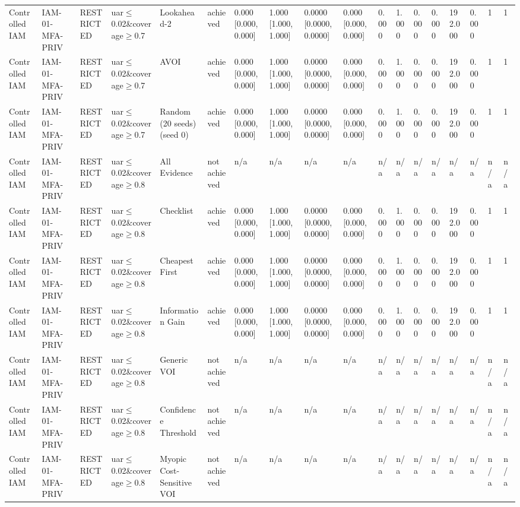 \begin{table}[!ht]
{\begin{tabular}{llllllllllllllllll}
Controlled IAM & IAM-01-MFA-PRIV & RESTRICTED & uar$\le$0.02\&coverage$\ge$0.7 & Lookahead-2 & achieved & 0.000 [0.000, 0.000] & 1.000 [1.000, 1.000] & 0.0000 [0.0000, 0.0000] & 0.000 [0.000, 0.000] & 0.000 & 1.000 & 0.000 & 0.000 & 192.000 & 0.000 & 1 & 1 \\
Controlled IAM & IAM-01-MFA-PRIV & RESTRICTED & uar$\le$0.02\&coverage$\ge$0.7 & AVOI & achieved & 0.000 [0.000, 0.000] & 1.000 [1.000, 1.000] & 0.0000 [0.0000, 0.0000] & 0.000 [0.000, 0.000] & 0.000 & 1.000 & 0.000 & 0.000 & 192.000 & 0.000 & 1 & 1 \\
Controlled IAM & IAM-01-MFA-PRIV & RESTRICTED & uar$\le$0.02\&coverage$\ge$0.7 & Random (20 seeds) (seed 0) & achieved & 0.000 [0.000, 0.000] & 1.000 [1.000, 1.000] & 0.0000 [0.0000, 0.0000] & 0.000 [0.000, 0.000] & 0.000 & 1.000 & 0.000 & 0.000 & 192.000 & 0.000 & 1 & 1 \\
Controlled IAM & IAM-01-MFA-PRIV & RESTRICTED & uar$\le$0.02\&coverage$\ge$0.8 & All Evidence & not achieved & n/a & n/a & n/a & n/a & n/a & n/a & n/a & n/a & n/a & n/a & n/a & n/a \\
Controlled IAM & IAM-01-MFA-PRIV & RESTRICTED & uar$\le$0.02\&coverage$\ge$0.8 & Checklist & achieved & 0.000 [0.000, 0.000] & 1.000 [1.000, 1.000] & 0.0000 [0.0000, 0.0000] & 0.000 [0.000, 0.000] & 0.000 & 1.000 & 0.000 & 0.000 & 192.000 & 0.000 & 1 & 1 \\
Controlled IAM & IAM-01-MFA-PRIV & RESTRICTED & uar$\le$0.02\&coverage$\ge$0.8 & Cheapest First & achieved & 0.000 [0.000, 0.000] & 1.000 [1.000, 1.000] & 0.0000 [0.0000, 0.0000] & 0.000 [0.000, 0.000] & 0.000 & 1.000 & 0.000 & 0.000 & 192.000 & 0.000 & 1 & 1 \\
Controlled IAM & IAM-01-MFA-PRIV & RESTRICTED & uar$\le$0.02\&coverage$\ge$0.8 & Information Gain & achieved & 0.000 [0.000, 0.000] & 1.000 [1.000, 1.000] & 0.0000 [0.0000, 0.0000] & 0.000 [0.000, 0.000] & 0.000 & 1.000 & 0.000 & 0.000 & 192.000 & 0.000 & 1 & 1 \\
Controlled IAM & IAM-01-MFA-PRIV & RESTRICTED & uar$\le$0.02\&coverage$\ge$0.8 & Generic VOI & not achieved & n/a & n/a & n/a & n/a & n/a & n/a & n/a & n/a & n/a & n/a & n/a & n/a \\
Controlled IAM & IAM-01-MFA-PRIV & RESTRICTED & uar$\le$0.02\&coverage$\ge$0.8 & Confidence Threshold & not achieved & n/a & n/a & n/a & n/a & n/a & n/a & n/a & n/a & n/a & n/a & n/a & n/a \\
Controlled IAM & IAM-01-MFA-PRIV & RESTRICTED & uar$\le$0.02\&coverage$\ge$0.8 & Myopic Cost-Sensitive VOI & not achieved & n/a & n/a & n/a & n/a & n/a & n/a & n/a & n/a & n/a & n/a & n/a & n/a \\

\end{tabular}}
\end{table}
